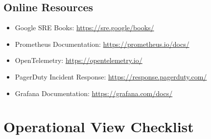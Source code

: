 \documentclass[11pt,letterpaper]{article}
\begin{document}
\subsection{Online Resources}

\begin{itemize}
    \item Google SRE Books: \url{https://sre.google/books/}
    \item Prometheus Documentation: \url{https://prometheus.io/docs/}
    \item OpenTelemetry: \url{https://opentelemetry.io/}
    \item PagerDuty Incident Response: \url{https://response.pagerduty.com/}
    \item Grafana Documentation: \url{https://grafana.com/docs/}
\end{itemize}

\appendix

\section{Operational View Checklist}
\end{document}
